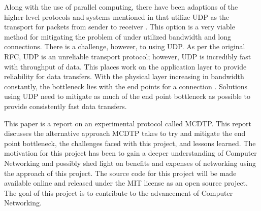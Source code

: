 Along with the use of parallel computing, there have been adaptions of the higher-level protocols and systems mentioned in \cite{Fan2010} that utilize UDP as the transport for packets from sender to receiver \cite{He2002}\cite{Aspera2016}\cite{Fan2010}\cite{Meiss2007}\cite{gu2007udt}. This option is a very viable method for mitigating the problem of under utilized bandwidth and long connections. There is a challenge, however, to using UDP. As per the original RFC, UDP is an unreliable transport protocol; however, UDP is incredibly fast with throughput of data. This places work on the application layer to provide reliability for data transfers. With the physical layer increasing in bandwidth constantly, the bottleneck lies with the end points for a connection \cite{Aspera2016}\cite{Fan2010}. Solutions using UDP need to mitigate as much of the end point bottleneck as possible to provide consistently fast data transfers.

This paper is a report on an experimental protocol called MCDTP. This report discusses the alternative approach MCDTP takes to try and mitigate the end point bottleneck, the challenges faced with this project, and lessons learned. The motivation for this project has been to gain a deeper understanding of Computer Networking and possibly shed light on benefits and expenses of networking using the approach of this project. The source code for this project will be made available online and released under the MIT license as an open source project. The goal of this project is to contribute to the advancement of Computer Networking.
